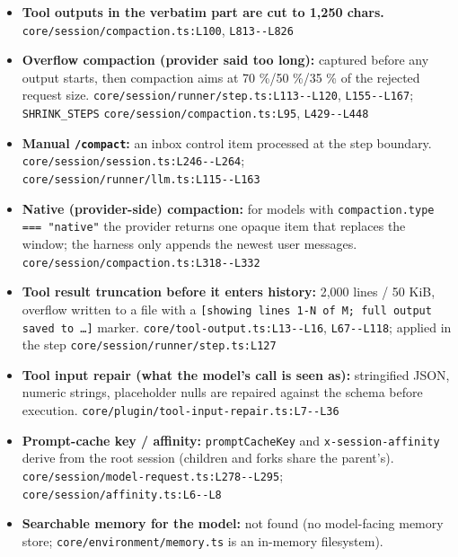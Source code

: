 \begin{itemize}
\item \textbf{Tool outputs in the verbatim part are cut to 1,250 chars.} \texttt{core/\allowbreak{}session/\allowbreak{}compaction.\allowbreak{}ts:\allowbreak{}L100}, \texttt{L813-\allowbreak{}-\allowbreak{}L826}
\item \textbf{Overflow compaction (provider said too long):} captured before any output starts, then compaction aims at 70 \%/50 \%/35 \% of the rejected request size. \texttt{core/\allowbreak{}session/\allowbreak{}runner/\allowbreak{}step.\allowbreak{}ts:\allowbreak{}L113-\allowbreak{}-\allowbreak{}L120}, \texttt{L155-\allowbreak{}-\allowbreak{}L167}; \texttt{SHRINK\_\allowbreak{}STEPS} \texttt{core/\allowbreak{}session/\allowbreak{}compaction.\allowbreak{}ts:\allowbreak{}L95}, \texttt{L429-\allowbreak{}-\allowbreak{}L448}
\item \textbf{Manual \texttt{/\allowbreak{}compact}:} an inbox control item processed at the step boundary. \texttt{core/\allowbreak{}session/\allowbreak{}session.\allowbreak{}ts:\allowbreak{}L246-\allowbreak{}-\allowbreak{}L264}; \texttt{core/\allowbreak{}session/\allowbreak{}runner/\allowbreak{}llm.\allowbreak{}ts:\allowbreak{}L115-\allowbreak{}-\allowbreak{}L163}
\item \textbf{Native (provider-side) compaction:} for models with \texttt{compaction.\allowbreak{}type === "native"} the provider returns one opaque item that replaces the window; the harness only appends the newest user messages. \texttt{core/\allowbreak{}session/\allowbreak{}compaction.\allowbreak{}ts:\allowbreak{}L318-\allowbreak{}-\allowbreak{}L332}
\item \textbf{Tool result truncation before it enters history:} 2,000 lines / 50 KiB, overflow written to a file with a \texttt{[showing lines 1-\allowbreak{}N of M; full output saved to \ldots{}]} marker. \texttt{core/\allowbreak{}tool-\allowbreak{}output.\allowbreak{}ts:\allowbreak{}L13-\allowbreak{}-\allowbreak{}L16}, \texttt{L67-\allowbreak{}-\allowbreak{}L118}; applied in the step \texttt{core/\allowbreak{}session/\allowbreak{}runner/\allowbreak{}step.\allowbreak{}ts:\allowbreak{}L127}
\item \textbf{Tool input repair (what the model's call is seen as):} stringified JSON, numeric strings, placeholder nulls are repaired against the schema before execution. \texttt{core/\allowbreak{}plugin/\allowbreak{}tool-\allowbreak{}input-\allowbreak{}repair.\allowbreak{}ts:\allowbreak{}L7-\allowbreak{}-\allowbreak{}L36}
\item \textbf{Prompt-cache key / affinity:} \texttt{promptCacheKey} and \texttt{x-\allowbreak{}session-\allowbreak{}affinity} derive from the root session (children and forks share the parent's). \texttt{core/\allowbreak{}session/\allowbreak{}model-\allowbreak{}request.\allowbreak{}ts:\allowbreak{}L278-\allowbreak{}-\allowbreak{}L295}; \texttt{core/\allowbreak{}session/\allowbreak{}affinity.\allowbreak{}ts:\allowbreak{}L6-\allowbreak{}-\allowbreak{}L8}
\item \textbf{Searchable memory for the model:} not found (no model-facing memory store; \texttt{core/\allowbreak{}environment/\allowbreak{}memory.\allowbreak{}ts} is an in-memory filesystem).
\end{itemize}

